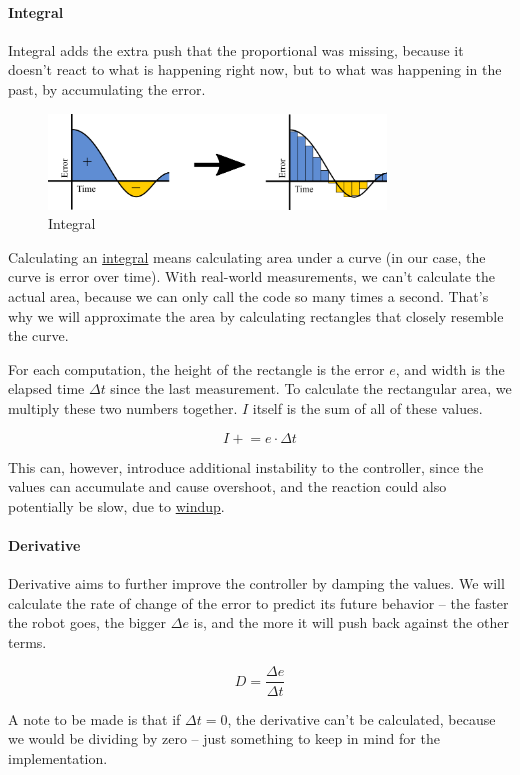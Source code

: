 \documentclass[12pt,twoside]{article}
\let\subsubsubsection\paragraph
\begin{document}
\subsubsubsection{Integral}
Integral adds the extra push that the proportional was missing, because it doesn't react to what is happening right now, but to what was happening in the past, by accumulating the error.

\begin{figure}[H]
\centering
\includegraphics[width=0.8\textwidth]{../assets/images/motor-controllers/integral.png}
\caption{Integral}
\end{figure}

Calculating an \href{https://en.wikipedia.org/wiki/Integral}{integral} means calculating area under a curve (in our case, the curve is error over time). With real-world measurements, we can't calculate the actual area, because we can only call the code so many times a second. That's why we will approximate the area by calculating rectangles that closely resemble the curve.

For each computation, the height of the rectangle is the error $e$, and width is the elapsed time $\Delta t$ since the last measurement. To calculate the rectangular area, we multiply these two numbers together. $I$ itself is the sum of all of these values.

\vspace{-\parskip}\[I \mathrel{+}= e \cdot \Delta t\]

This can, however, introduce additional instability to the controller, since the values can accumulate and cause overshoot, and the reaction could also potentially be slow, due to \href{https://en.wikipedia.org/wiki/Integral_windup}{windup}.


\subsubsubsection{Derivative}
Derivative aims to further improve the controller by damping the values. We will calculate the rate of change of the error to predict its future behavior -- the faster the robot goes, the bigger $\Delta e$ is, and the more it will push back against the other terms.

\vspace{-\parskip}\[D = \frac{\Delta e}{\Delta t}\]

A note to be made is that if $\Delta t = 0$, the derivative can't be calculated, because we would be dividing by zero -- just something to keep in mind for the implementation.
\end{document}
